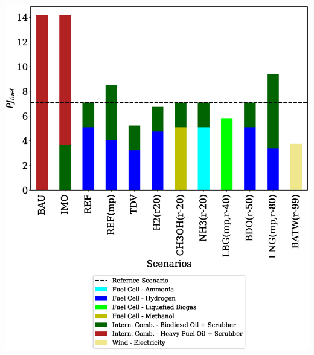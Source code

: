 \documentclass[article]{elsarticle}
\begin{document}
\begin{minipage}[t]{0.49\textwidth}
    \centering
    \captionsetup{justification=centering}
    \includegraphics[width=.95\textwidth]{figures/AllFuel2050.eps}
    \label{fig:AllFuel2050}
\end{minipage}\\ %
\end{document}
